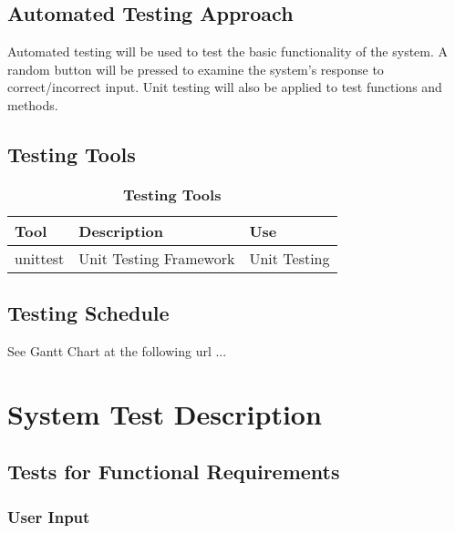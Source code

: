 \documentclass[12pt, titlepage]{article}
\begin{document}
\subsection{Automated Testing Approach}
Automated testing will be used to test the basic functionality of the system. A random button will be pressed to examine the system's response to correct/incorrect input. Unit testing will also be applied to test functions and methods.

\subsection{Testing Tools}
\begin{table}[h]
\caption{\bf Testing Tools}
\begin{tabularx}{\textwidth}{p{3cm}p{6cm}X}
\toprule {\bf Tool} & {\bf Description} & {\bf Use}\\
\midrule
unittest & Unit Testing Framework & Unit Testing \\
\bottomrule
\end{tabularx}
\end{table}

\subsection{Testing Schedule}
		
See Gantt Chart at the following url ...
\section{System Test Description}
	
\subsection{Tests for Functional Requirements}

\subsubsection{User Input}
		
\end{document}
